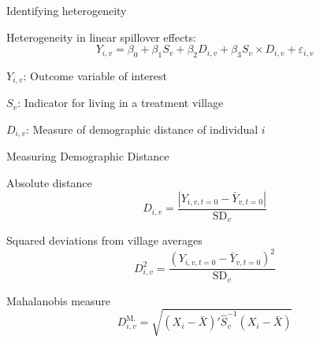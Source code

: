\documentclass[14pt, aspectratio=169]{beamer}
\newenvironment{wideitemize}{\itemize\addtolength{\itemsep}{10pt}}{\enditemize}
\let\OLDitemize\itemize
\renewcommand\itemize{\OLDitemize\addtolength{\itemsep}{10pt}}
\begin{document}
\begin{frame}{Identifying heterogeneity}
\begin{wideitemize}
	\item Heterogeneity in linear spillover effects:
	\begin{equation*} \label{eq:interaction}
	Y_{i,v} = \beta_0 + \beta_1 S_v + \beta_2 D_{i,v} + \beta_3 S_v \times  D_{i,v} + \varepsilon_{i,v}
	\end{equation*}

	\item $Y_{i,v}$: Outcome variable of interest
    \item $S_v$: Indicator for living in a treatment village
    \item $D_{i,v}$: Measure of demographic distance of individual $i$
 
\end{wideitemize}
\end{frame}

\begin{frame}{Measuring Demographic Distance}
\begin{wideitemize}
	\item Absolute distance
	$$D_{i,v}  = \frac{|Y_{i,v,t=0} - \bar Y_{v,t=0}|}{\text{SD}_v} $$
	\item Squared deviations from village averages
	$$ D^2_{i,v}= \frac{(Y_{i,v,t=0} - \bar Y_{v,t=0})^2}{\text{SD}_v} $$
	\item Mahalanobis measure
	$$D^\text{M.}_{i,v} = \sqrt{( X_i - {\bar X})' {\hat S}^{-1}_v ( X_i - {\bar X})}  $$ 
\end{wideitemize}
\end{frame}
\end{document}
